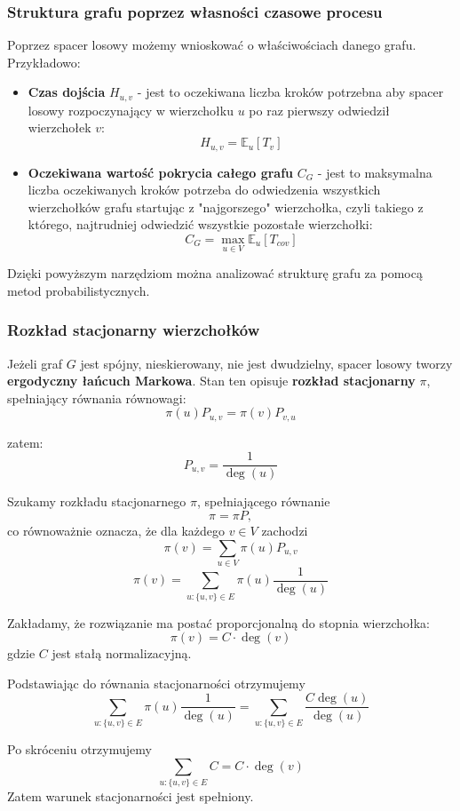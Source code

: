 \subsubsection{Struktura grafu poprzez własności czasowe procesu}

Poprzez spacer losowy możemy wnioskować o właściwościach danego grafu. Przykładowo:
\begin{itemize}
    \item \textbf{Czas dojścia} $H_{u,v}$ - jest to oczekiwana liczba kroków potrzebna aby spacer losowy rozpoczynający w wierzchołku $u$ po raz pierwszy odwiedził wierzchołek $v$:
    $$H_{u,v}=\mathbb{E}_u[T_v]$$
    \item \textbf{Oczekiwana wartość pokrycia całego grafu} $C_G$ - jest to maksymalna liczba oczekiwanych kroków potrzeba do odwiedzenia wszystkich wierzchołków grafu startując z "najgorszego" wierzchołka, czyli takiego z którego, najtrudniej odwiedzić wszystkie pozostałe wierzchołki:
    $$C_G=\max_{u\in V}\mathbb{E}_u[T_{cov}]$$
\end{itemize}

Dzięki powyższym narzędziom można analizować strukturę grafu za pomocą metod probabilistycznych.

\subsubsection{Rozkład stacjonarny wierzchołków}

Jeżeli graf $G$ jest spójny, nieskierowany, nie jest dwudzielny, spacer losowy tworzy \textbf{ergodyczny łańcuch Markowa}. Stan ten opisuje \textbf{rozkład stacjonarny} $\pi$, spełniający równania równowagi:
$$\pi(u)P_{u,v}=\pi(v)P_{v,u}$$

zatem:
$$P_{u,v} = \frac{1}{\deg(u)}$$

Szukamy rozkładu stacjonarnego $\pi$, spełniającego równanie
$$\pi = \pi P,$$
co równoważnie oznacza, że dla każdego $v \in V$ zachodzi
$$\pi(v) = \sum_{u \in V} \pi(u) P_{u,v}$$
$$\pi(v) = \sum_{u:\{u,v\}\in E} \pi(u)\frac{1}{\deg(u)}$$

Zakładamy, że rozwiązanie ma postać proporcjonalną do stopnia wierzchołka:
$$\pi(v) = C \cdot \deg(v)$$
gdzie $C$ jest stałą normalizacyjną.

Podstawiając do równania stacjonarności otrzymujemy
$$\sum_{u:\{u,v\}\in E} \pi(u)\frac{1}{\deg(u)}=\sum_{u:\{u,v\}\in E} \frac{C\deg(u)}{\deg(u)}$$

Po skróceniu otrzymujemy
$$\sum_{u:\{u,v\}\in E} C = C \cdot \deg(v)$$
Zatem warunek stacjonarności jest spełniony.

